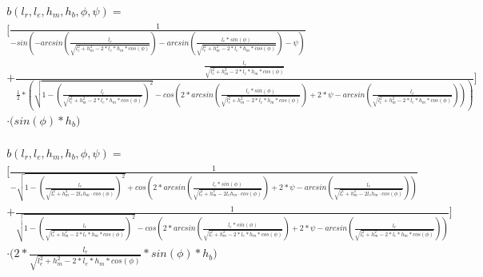 \documentclass[12pt,a4paper, landscape]{article}
\begin{document}
\begin{align*}
	\begin{split}
		b (l_r, l_e, h_m, h_b, \phi, \psi) =\\ 
		\bigg[\frac{1}{-sin(-arcsin(\frac{l_r}{\sqrt{l_e ^2 + h_m^2 - 2*l_e*h_m * cos(\phi)}}) - arcsin(\frac{l_e * sin(\phi)}{\sqrt{l_e ^2 + h_m^2 - 2*l_e*h_m * cos(\phi)}}) - \psi)}\\ 
		+ \frac{\frac{l_r}{\sqrt{l_e ^2 + h_m^2 - 2*l_e*h_m * cos(\phi)}}}{\frac{1}{2} * \left( \sqrt{1- \left(\frac{l_r}{\sqrt{l_e ^2 + h_m^2 - 2*l_e*h_m * cos(\phi)}}\right)^2} - cos(2*arcsin(\frac{l_e * sin(\phi)}{\sqrt{l_e ^2 + h_m^2 - 2*l_e*h_m * cos(\phi)}}) + 2* \psi - arcsin(\frac{l_r}{\sqrt{l_e ^2 + h_m^2 - 2*l_e*h_m * cos(\phi)}})) \right)}\bigg]\\
		\cdot\bigg(sin(\phi) * h_b\bigg)
	\end{split}
\end{align*}
\newpage

\begin{align*}
	\begin{split}
		b (l_r, l_e, h_m, h_b, \phi, \psi) =\\ 
		\bigg[\frac{1}{- \sqrt{1 - \left(\frac{l_r}{\sqrt{l_e^2 + h_m^2 - 2l_eh_m\cdot cos(\phi)}}\right)^2} + cos(2 * arcsin(\frac{l_e * sin(\phi)}{\sqrt{l_e^2 + h_m^2 - 2l_eh_m\cdot cos(\phi)}}) + 2 * \psi - arcsin(\frac{l_r}{\sqrt{l_e^2 + h_m^2 - 2l_eh_m\cdot cos(\phi)}}))}\\ 
		+ \frac{1}{\sqrt{1- \left(\frac{l_r}{\sqrt{l_e ^2 + h_m^2 - 2*l_e*h_m * cos(\phi)}}\right)^2} - cos(2*arcsin(\frac{l_e * sin(\phi)}{\sqrt{l_e ^2 + h_m^2 - 2*l_e*h_m * cos(\phi)}}) + 2* \psi - arcsin(\frac{l_r}{\sqrt{l_e ^2 + h_m^2 - 2*l_e*h_m * cos(\phi)}}))}\bigg]\\
		\cdot\bigg(2 * \frac{l_r}{\sqrt{l_e ^2 + h_m^2 - 2*l_e*h_m * cos(\phi)}} * sin(\phi) * h_b\bigg)
	\end{split}
\end{align*}
\end{document}
